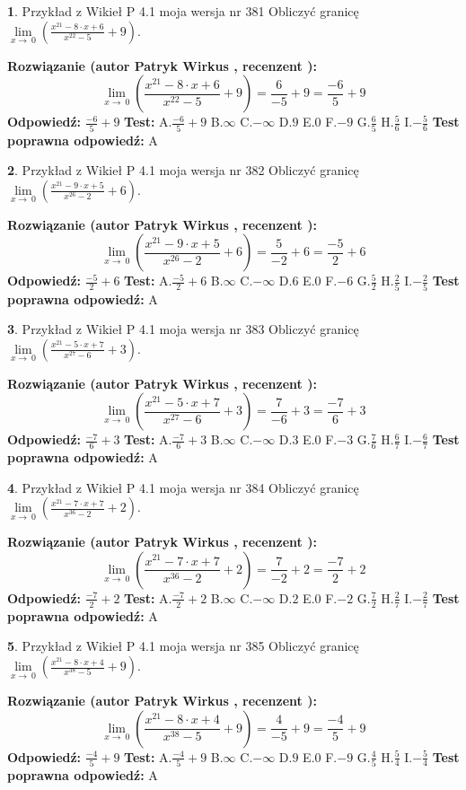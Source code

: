 \documentclass[12pt, a4paper]{article}
\theoremstyle{definition} %
\newtheorem{zad}{}
\newcommand{\zadStart}[1]{\begin{zad}#1\newline}
\newcommand{\zadStop}{\end{zad}}
\newcommand{\rozwStart}[2]{\noindent \textbf{Rozwiązanie (autor #1 , recenzent #2): }\newline}
\newcommand{\rozwStop}{\newline}
\newcommand{\odpStart}{\noindent \textbf{Odpowiedź:}\newline}
\newcommand{\odpStop}{\newline}
\newcommand{\testStart}{\noindent \textbf{Test:}\newline}
\newcommand{\testStop}{\newline}
\newcommand{\kluczStart}{\noindent \textbf{Test poprawna odpowiedź:}\newline}
\newcommand{\kluczStop}{\newline}
\begin{document}
\zadStart{Przykład z Wikieł P 4.1 moja wersja nr 381}
Obliczyć granicę $\lim\limits_{x\to\ 0}(\frac{x^{21}-8 \cdot x +6}{x^{22}-5}+9)$.
\zadStop
\rozwStart{Patryk Wirkus}{}
$$\lim\limits_{x\to\ 0}(\frac{x^{21}-8 \cdot x +6}{x^{22}-5}+9)=\frac{6}{-5}+9=\frac{-6}{5}+9$$
\rozwStop
\odpStart
$\frac{-6}{5}+9$
\odpStop
\testStart
A.$\frac{-6}{5}+9$
B.$\infty$
C.$-\infty$
D.$9$
E.$0$
F.$-9$
G.$\frac{6}{5}$
H.$\frac{5}{6}$
I.$-\frac{5}{6}$
\testStop
\kluczStart
A
\kluczStop



\zadStart{Przykład z Wikieł P 4.1 moja wersja nr 382}
Obliczyć granicę $\lim\limits_{x\to\ 0}(\frac{x^{21}-9 \cdot x +5}{x^{26}-2}+6)$.
\zadStop
\rozwStart{Patryk Wirkus}{}
$$\lim\limits_{x\to\ 0}(\frac{x^{21}-9 \cdot x +5}{x^{26}-2}+6)=\frac{5}{-2}+6=\frac{-5}{2}+6$$
\rozwStop
\odpStart
$\frac{-5}{2}+6$
\odpStop
\testStart
A.$\frac{-5}{2}+6$
B.$\infty$
C.$-\infty$
D.$6$
E.$0$
F.$-6$
G.$\frac{5}{2}$
H.$\frac{2}{5}$
I.$-\frac{2}{5}$
\testStop
\kluczStart
A
\kluczStop



\zadStart{Przykład z Wikieł P 4.1 moja wersja nr 383}
Obliczyć granicę $\lim\limits_{x\to\ 0}(\frac{x^{21}-5 \cdot x +7}{x^{27}-6}+3)$.
\zadStop
\rozwStart{Patryk Wirkus}{}
$$\lim\limits_{x\to\ 0}(\frac{x^{21}-5 \cdot x +7}{x^{27}-6}+3)=\frac{7}{-6}+3=\frac{-7}{6}+3$$
\rozwStop
\odpStart
$\frac{-7}{6}+3$
\odpStop
\testStart
A.$\frac{-7}{6}+3$
B.$\infty$
C.$-\infty$
D.$3$
E.$0$
F.$-3$
G.$\frac{7}{6}$
H.$\frac{6}{7}$
I.$-\frac{6}{7}$
\testStop
\kluczStart
A
\kluczStop



\zadStart{Przykład z Wikieł P 4.1 moja wersja nr 384}
Obliczyć granicę $\lim\limits_{x\to\ 0}(\frac{x^{21}-7 \cdot x +7}{x^{36}-2}+2)$.
\zadStop
\rozwStart{Patryk Wirkus}{}
$$\lim\limits_{x\to\ 0}(\frac{x^{21}-7 \cdot x +7}{x^{36}-2}+2)=\frac{7}{-2}+2=\frac{-7}{2}+2$$
\rozwStop
\odpStart
$\frac{-7}{2}+2$
\odpStop
\testStart
A.$\frac{-7}{2}+2$
B.$\infty$
C.$-\infty$
D.$2$
E.$0$
F.$-2$
G.$\frac{7}{2}$
H.$\frac{2}{7}$
I.$-\frac{2}{7}$
\testStop
\kluczStart
A
\kluczStop



\zadStart{Przykład z Wikieł P 4.1 moja wersja nr 385}
Obliczyć granicę $\lim\limits_{x\to\ 0}(\frac{x^{21}-8 \cdot x +4}{x^{38}-5}+9)$.
\zadStop
\rozwStart{Patryk Wirkus}{}
$$\lim\limits_{x\to\ 0}(\frac{x^{21}-8 \cdot x +4}{x^{38}-5}+9)=\frac{4}{-5}+9=\frac{-4}{5}+9$$
\rozwStop
\odpStart
$\frac{-4}{5}+9$
\odpStop
\testStart
A.$\frac{-4}{5}+9$
B.$\infty$
C.$-\infty$
D.$9$
E.$0$
F.$-9$
G.$\frac{4}{5}$
H.$\frac{5}{4}$
I.$-\frac{5}{4}$
\testStop
\kluczStart
A
\kluczStop
\end{document}

